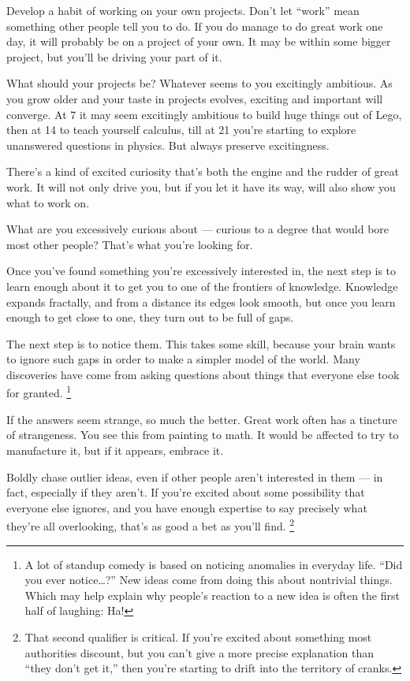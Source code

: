 Develop a habit of working on your own projects. Don't let ``work'' mean
something other people tell you to do. If you do manage to do great work
one day, it will probably be on a project of your own. It may be within
some bigger project, but you'll be driving your part of it.

What should your projects be? Whatever seems to you excitingly
ambitious. As you grow older and your taste in projects evolves,
exciting and important will converge. At 7 it may seem excitingly
ambitious to build huge things out of Lego, then at 14 to teach yourself
calculus, till at 21 you're starting to explore unanswered questions in
physics. But always preserve excitingness.

There's a kind of excited curiosity that's both the engine and the
rudder of great work. It will not only drive you, but if you let it have
its way, will also show you what to work on.

What are you excessively curious about --- curious to a degree that
would bore most other people? That's what you're looking for.

Once you've found something you're excessively interested in, the next
step is to learn enough about it to get you to one of the frontiers of
knowledge. Knowledge expands fractally, and from a distance its edges
look smooth, but once you learn enough to get close to one, they turn
out to be full of gaps.

The next step is to notice them. This takes some skill, because your
brain wants to ignore such gaps in order to make a simpler model of the
world. Many discoveries have come from asking questions about things
that everyone else took for granted. \footnote{A lot of standup comedy is based on noticing anomalies in
everyday life. ``Did you ever notice\ldots?'' New ideas come from doing
this about nontrivial things. Which may help explain why people's
reaction to a new idea is often the first half of laughing: Ha!}

If the answers seem strange, so much the better. Great work often has a
tincture of strangeness. You see this from painting to math. It would be
affected to try to manufacture it, but if it appears, embrace it.

Boldly chase outlier ideas, even if other people aren't interested in
them --- in fact, especially if they aren't. If you're excited about
some possibility that everyone else ignores, and you have enough
expertise to say precisely what they're all overlooking, that's as good
a bet as you'll find. \footnote{That second qualifier is critical. If you're excited about
something most authorities discount, but you can't give a more precise
explanation than ``they don't get it,'' then you're starting to drift
into the territory of cranks.}

